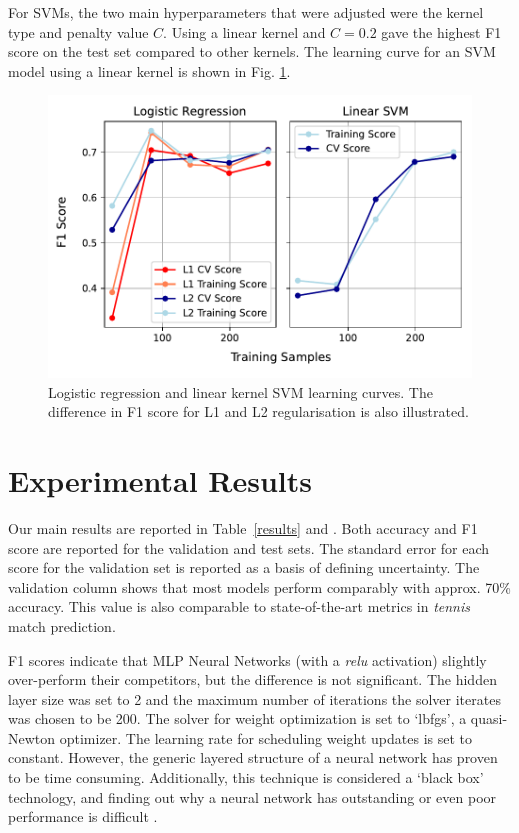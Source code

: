 
For SVMs, the two main hyperparameters that were adjusted were the kernel type and penalty value $C$. Using a linear kernel and $C=0.2$ gave the highest F1 score on the test set compared to other kernels. The learning curve for an SVM model using a linear kernel is shown in Fig. \ref{fig:learningcurve}.

\begin{figure}[H]
\includegraphics[width=8.cm]{plots/chiang5.pdf}
\caption{Logistic regression and linear kernel SVM learning curves. The difference in F1 score for L1 and L2 regularisation is also illustrated.}
\label{fig:learningcurve}
\centering
\end{figure}

\section{Experimental Results} \label{experresults}
Our main results are reported in Table~\ref{results} and .
Both accuracy and F1 score are reported for the validation and test sets. The standard error for each score for the validation set is reported as a basis of defining uncertainty. The validation column shows that most models perform comparably with approx. 70\% accuracy. This value is also comparable to state-of-the-art metrics in \textit{tennis} match prediction.

F1 scores indicate that MLP Neural Networks (with a \textit{relu} activation) slightly over-perform their competitors, but the difference is not significant. The hidden layer size was set to 2 and the maximum number of iterations the solver iterates was chosen to be 200. The solver for weight optimization is set to `lbfgs', a quasi-Newton optimizer. The learning rate for scheduling weight updates is set to constant. However, the generic layered structure of a neural network has proven to be time consuming. Additionally, this technique is considered a `black box' technology, and finding out why a neural network has outstanding or even poor performance is difficult \cite{noriega2005multilayer}.

